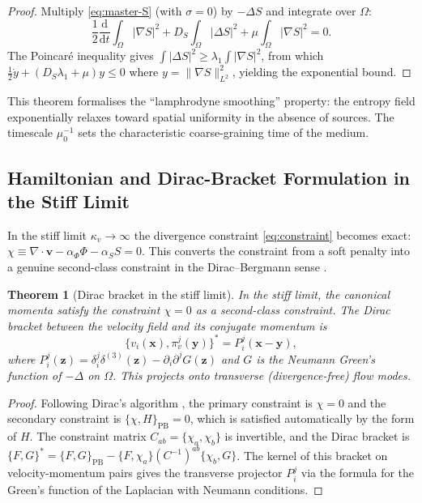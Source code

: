 \documentclass[12pt, a4paper]{article}
\theoremstyle{plain}
\newtheorem{theorem}{Theorem}[section]
\theoremstyle{definition}
\theoremstyle{remark}
\newcommand{\vfield}{\mathbf{v}}
\newcommand{\divv}{\nabla\!\cdot\!\vfield}
\begin{document}
\begin{proof}
Multiply \eqref{eq:master-S} (with $\sigma = 0$) by $-\Delta S$ and integrate over $\Omega$:
\[
\frac{1}{2}\frac{\mathrm{d}}{\mathrm{d}t}\int_\Omega|\nabla S|^2
+ D_S\int_\Omega|\Delta S|^2 + \mu\int_\Omega|\nabla S|^2 = 0.
\]
The Poincaré inequality gives $\int|\Delta S|^2 \geq \lambda_1\int|\nabla S|^2$, from
which $\tfrac{1}{2}\dot{y} + (D_S\lambda_1 + \mu)y \leq 0$ where
$y = \|\nabla S\|_{L^2}^2$, yielding the exponential bound.
\end{proof}

This theorem formalises the ``lamphrodyne smoothing'' property: the entropy field
exponentially relaxes toward spatial uniformity in the absence of sources.  The timescale
$\mu_0^{-1}$ sets the characteristic coarse-graining time of the medium.

\subsection{Hamiltonian and Dirac-Bracket Formulation in the Stiff Limit}

In the stiff limit $\kappa_v \to \infty$ the divergence constraint \eqref{eq:constraint}
becomes exact: $\chi \equiv \divv - \alpha_\Phi\Phi - \alpha_S S = 0$.  This converts
the constraint from a soft penalty into a genuine second-class constraint in the
Dirac--Bergmann sense \cite{Dirac1964, HenneauxTeitelboim1992}.

\begin{theorem}[Dirac bracket in the stiff limit]
\label{thm:dirac}
In the stiff limit, the canonical momenta satisfy the constraint $\chi = 0$ as a
second-class constraint.  The Dirac bracket between the velocity field and its conjugate
momentum is
\[
\{v_i(\mathbf{x}), \pi^j_v(\mathbf{y})\}^* = P^j_i(\mathbf{x} - \mathbf{y}),
\]
where $P^j_i(\mathbf{z}) = \delta^j_i\delta^{(3)}(\mathbf{z})
- \partial_i\partial^j G(\mathbf{z})$ and $G$ is the Neumann Green's function of
$-\Delta$ on $\Omega$.  This projects onto transverse (divergence-free) flow modes.
\end{theorem}

\begin{proof}
Following Dirac's algorithm \cite{Dirac1964}, the primary constraint is $\chi = 0$ and
the secondary constraint is $\{\chi, H\}_{\mathrm{PB}} = 0$, which is satisfied automatically
by the form of $H$.  The constraint matrix $C_{ab} = \{\chi_a, \chi_b\}$ is invertible,
and the Dirac bracket is $\{F,G\}^* = \{F,G\}_{\mathrm{PB}} - \{F,\chi_a\}(C^{-1})^{ab}\{\chi_b,G\}$.
The kernel of this bracket on velocity-momentum pairs gives the transverse projector
$P^j_i$ via the formula for the Green's function of the Laplacian with Neumann conditions.
\end{proof}
\end{document}
